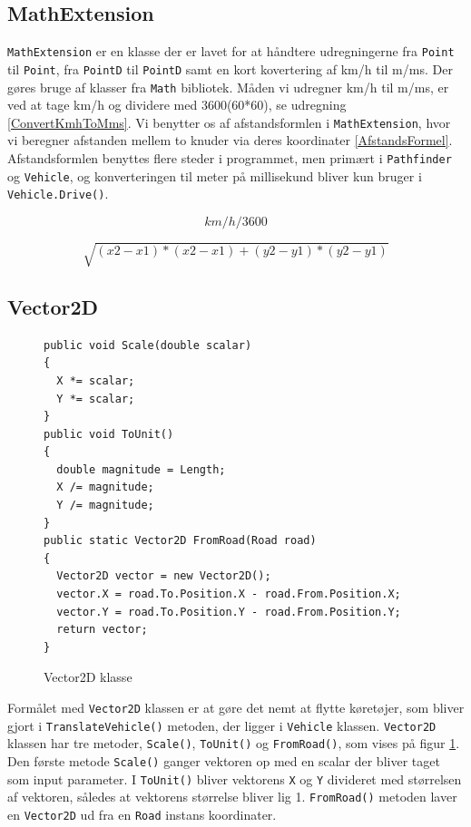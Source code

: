 \subsection*{MathExtension}
\texttt{MathExtension} er en klasse der er lavet for at håndtere udregningerne fra \texttt{Point} til \texttt{Point}, fra \texttt{PointD} til \texttt{PointD} samt en kort kovertering af km/h til m/ms. Der gøres bruge af klasser fra \texttt{Math} bibliotek. Måden vi udregner km/h til m/ms, er ved at tage km/h og dividere med 3600(60*60), se udregning \ref{ConvertKmhToMms}. Vi benytter os af afstandsformlen i \texttt{MathExtension}, hvor vi beregner afstanden mellem to knuder via deres koordinater \ref{AfstandsFormel}. Afstandsformlen benyttes flere steder i programmet, men primært i \texttt{Pathfinder} og \texttt{Vehicle}, og konverteringen til meter på millisekund bliver kun bruger i \texttt{Vehicle.Drive()}.

\begin{equation} \label{ConvertKmhToMms}
km/h / 3600
\end{equation}

\begin{equation} \label{AfstandsFormel}
\sqrt{(x2 - x1) * (x2 - x1) + (y2 - y1) * (y2 - y1)}
\end{equation}

\subsection*{Vector2D}
\begin{figure}[H]
\begin{lstlisting}
public void Scale(double scalar)
{
  X *= scalar;
  Y *= scalar;
}
public void ToUnit()
{
  double magnitude = Length;
  X /= magnitude;
  Y /= magnitude;
}
public static Vector2D FromRoad(Road road)
{
  Vector2D vector = new Vector2D();
  vector.X = road.To.Position.X - road.From.Position.X;
  vector.Y = road.To.Position.Y - road.From.Position.Y;
  return vector;
}
\end{lstlisting}
\caption{Vector2D klasse}\label{Vector2D}
\end{figure}

Formålet med \texttt{Vector2D} klassen er at gøre det nemt at flytte køretøjer, som bliver gjort i \texttt{TranslateVehicle()} metoden, der ligger i \texttt{Vehicle} klassen. \texttt{Vector2D} klassen har tre metoder, \texttt{Scale()}, \texttt{ToUnit()} og \texttt{FromRoad()}, som vises på figur \ref{Vector2D}. Den første metode \texttt{Scale()} ganger vektoren op med en scalar der bliver taget som input parameter. I \texttt{ToUnit()} bliver vektorens \texttt{X} og \texttt{Y} divideret med størrelsen af vektoren, således at vektorens størrelse bliver lig 1. \texttt{FromRoad()} metoden laver en \texttt{Vector2D} ud fra en \texttt{Road} instans koordinater.